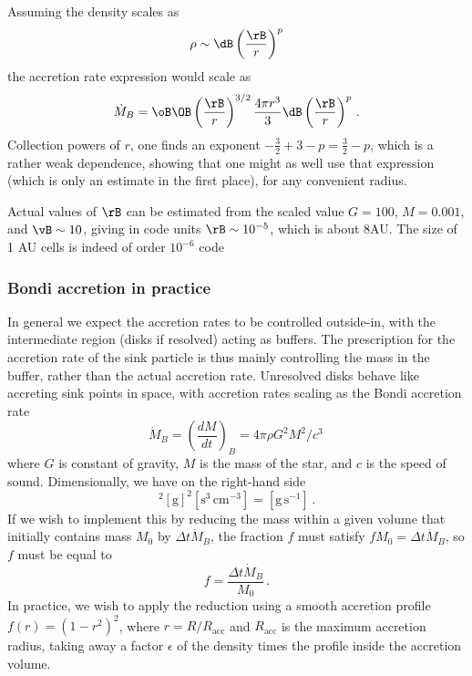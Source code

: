 \documentclass[paper=a4,fontsize=11pt]{scrartcl}
\numberwithin{equation}{section}		%
\numberwithin{figure}{section}			%
\numberwithin{table}{section}				%
\begin{document}
Assuming the density scales as
\begin{equation}
    \rho \sim \dB \left(\frac{\rB}{r}\right)^p
\end{equation}
the accretion rate expression would scale as 
\begin{equation}
    \dot{M}_{B} = \oB\OB\left(\frac{\rB}{r}\right)^{3/2}\frac{4\pi r^3}{3}\dB \left(\frac{\rB}{r}\right)^p\,.
\end{equation}
Collection powers of $r$, one finds an exponent $-\frac{3}{2}+3-p=\frac{3}{2}-p$, which is a rather weak dependence, showing that one might as well use that expression (which is only an estimate in the first place), for any convenient radius.

Actual values of $\rB$ can be estimated from the scaled value $G=100$,  $M=0.001$, and $\vB\sim10$, giving in code units $\rB\sim10^{-5}$, which is about 8AU.  The size of 1 AU cells is indeed of order $10^{-6}$ code 

\subsubsection{Bondi accretion in practice}
In general we expect the accretion rates to be controlled outside-in, with the intermediate region (disks if resolved) acting as buffers.  The prescription for the accretion rate of the sink particle is thus mainly controlling the mass in the buffer, rather than the actual accretion rate.   Unresolved disks behave like accreting sink points in space, with accretion rates scaling as the Bondi accretion rate
\def\MdotB{\dot{M}_B}
\begin{equation}
     \MdotB = \left(\frac{dM}{dt}\right)_B = 4 \pi \rho G^2 M^2 / c^3 \,
\end{equation}
where $G$ is constant of gravity, $M$ is the mass of the star, and $c$ is the speed of sound.  Dimensionally, we have on the right-hand side
\def\cm{\mathrm{cm}}
\def\g{\mathrm{g}}
\def\s{\mathrm{s}}
\begin{equation}
     [ \g \, \cm ^{-3}] [\cm^3 \g^{-1} \s^{-2}]^2 [\g]^2 [\s^3 \,\cm^{-3}] 
     = [\g \, \s^{-1}] \,.
\end{equation}
If we wish to implement this by reducing the mass within a given volume that initially contains mass $M_0$ by $\Delta t \dot{M}_B$, the fraction $f$ must satisfy $f M_0 = \Delta t \dot{M}_B$, so $f$ must be equal to
\begin{equation}
    f = \frac{\Delta t \dot{M}_B}{M_0} \,.
\end{equation}
\def\Racc{R_\mathrm{acc}}
In practice, we wish to apply the reduction using a smooth accretion profile $f(r) = (1-r^2)^2$, where $r=R/R_\mathrm{acc}$ and $\Racc$ is the maximum accretion radius, taking away a factor $\epsilon$ of the density times the profile inside the accretion volume.
\end{document}
